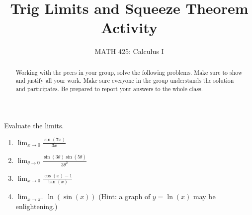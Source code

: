 \documentclass{ximera}
\title{Trig Limits and Squeeze Theorem Activity}
\author{MATH 425: Calculus I}
\begin{document}
\begin{abstract}
    Working with the peers in your group, solve the following problems. Make sure to show and justify all your work. Make sure everyone in the group understands the solution and participates. Be prepared to report your answers to the whole class. 
\end{abstract}
\maketitle


\begin{exercise}
    Evaluate the limits.
    \begin{enumerate}
        \item $\displaystyle \lim_{x\rightarrow 0}\frac{\sin(7x)}{3x}$
        \item $\displaystyle\lim_{\theta \rightarrow 0}\frac{\sin(3\theta)\sin(5\theta)}{3\theta^2}$
        \item $\displaystyle\lim_{x\rightarrow 0} \frac{\cos(x)-1}{\tan(x)}$
        \item $\displaystyle\lim_{x\rightarrow \pi^-} \ln(\sin(x))$ (Hint: a graph of $y=\ln(x)$ may be enlightening.)
    \end{enumerate}  
    
\end{exercise}
\end{document}
